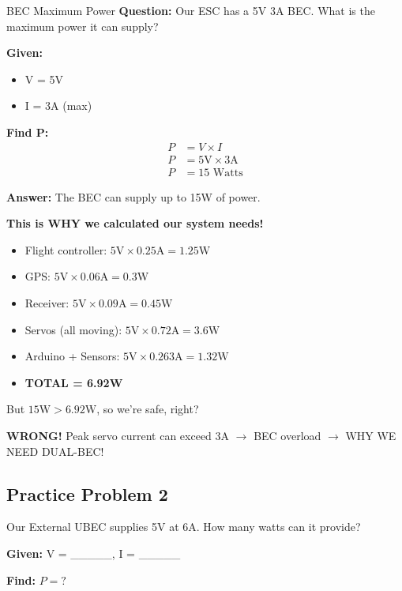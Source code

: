 \documentclass[11pt,letterpaper]{article}
\begin{document}
\begin{examplebox}{BEC Maximum Power}
\textbf{Question:} Our ESC has a 5V 3A BEC. What is the maximum power it can supply?

\textbf{Given:}
\begin{itemize}
  \item V = 5V
  \item I = 3A (max)
\end{itemize}

\textbf{Find P:}
\begin{align*}
P &= V \times I\\
P &= 5\text{V} \times 3\text{A}\\
P &= 15\text{ Watts}
\end{align*}

\textbf{Answer:} The BEC can supply up to 15W of power.

\vspace{0.5cm}

\textbf{This is WHY we calculated our system needs!}
\begin{itemize}
  \item Flight controller: $5\text{V} \times 0.25\text{A} = 1.25\text{W}$
  \item GPS: $5\text{V} \times 0.06\text{A} = 0.3\text{W}$
  \item Receiver: $5\text{V} \times 0.09\text{A} = 0.45\text{W}$
  \item Servos (all moving): $5\text{V} \times 0.72\text{A} = 3.6\text{W}$
  \item Arduino + Sensors: $5\text{V} \times 0.263\text{A} = 1.32\text{W}$
  \item \textbf{TOTAL = 6.92W}
\end{itemize}

But $15\text{W} > 6.92\text{W}$, so we're safe, right?

\textbf{WRONG!} Peak servo current can exceed 3A $\rightarrow$ BEC overload $\rightarrow$ WHY WE NEED DUAL-BEC!
\end{examplebox}

\subsection{Practice Problem 2}

Our External UBEC supplies 5V at 6A. How many watts can it provide?

\textbf{Given:} V = \_\_\_\_\_, I = \_\_\_\_\_

\textbf{Find:} $P = ?$
\end{document}
